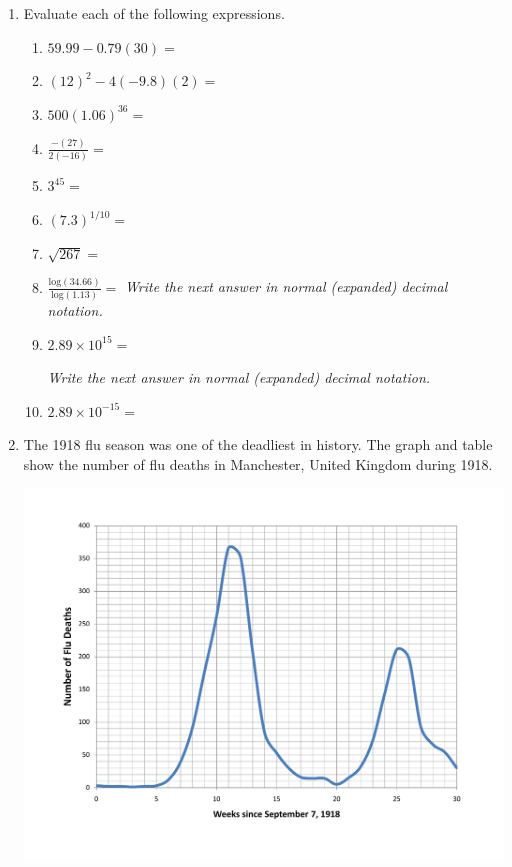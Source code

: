 \documentclass[12pt]{article}
\begin{document}
  \vspace{.2in}
 
 \hrulefill
 
\newpage  %

\begin{enumerate}
\item Evaluate each of the following expressions.

\begin{enumerate}
\item $59.99 - 0.79(30)=$
\vfill
\item $(12)^2-4(-9.8)(2)=$
\vfill
\item $500(1.06)^{36}=$
\vfill
\item $\displaystyle \frac{-(27)}{2(-16)}=$
\vfill
\item $3^{45}=$
\vfill
\item $(7.3)^{1/10}=$
\vfill
\item $\sqrt{267}=$
\vfill
\item $\displaystyle \frac{\text{log}(34.66)}{\text{log}(1.13)}=$
\vfill
\emph{Write the next answer in normal (expanded) decimal notation.}
\item $2.89 \times 10^{15}=$  


\vfill
\emph{Write the next answer in normal (expanded) decimal notation.}
\item $2.89 \times 10^{-15}=$  


\vfill
\end{enumerate}

\newpage  %

\item The 1918 flu season was one of the deadliest in history.  The graph and table show the number of flu deaths in Manchester, United Kingdom during 1918.

\begin{center}
\includegraphics [width = .8\textwidth] {ManchesterFlu.pdf}
\end{center}


\end{enumerate}
\end{document}
